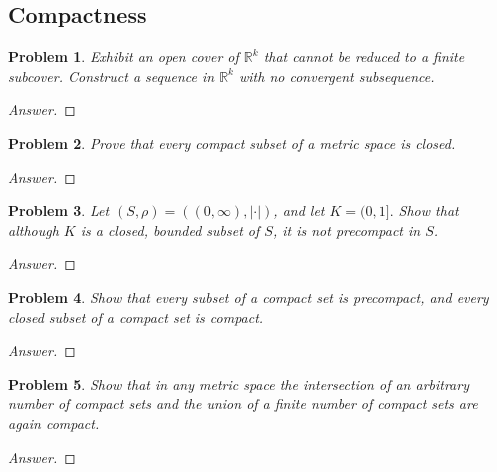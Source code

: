 \documentclass{article}
\newtheorem{problem}{Problem}[section]
\begin{document}
\subsection{Compactness}

\begin{problem}Exhibit an open cover of $\mathbb{R}^{k}$ that cannot be reduced to a finite subcover. Construct a sequence in $\mathbb{R}^{k}$ with no convergent subsequence.
\end{problem}

\begin{proof}[Answer]
    
\end{proof}

\begin{problem}Prove that every compact subset of a metric space is closed.
\end{problem}

\begin{proof}[Answer]
    
\end{proof}

\begin{problem}Let $(S, \rho)=((0, \infty),|\cdot|)$, and let $K=(0,1] .$ Show that although $K$ is a closed, bounded subset of $S$, it is not precompact in $S$.
\end{problem}

\begin{proof}[Answer]
    
\end{proof}

\begin{problem} Show that every subset of a compact set is precompact, and every closed subset of a compact set is compact.
\end{problem}

\begin{proof}[Answer]
    
\end{proof}

\begin{problem} Show that in any metric space the intersection of an arbitrary number of compact sets and the union of a finite number of compact sets are again compact.
\end{problem}

\begin{proof}[Answer]
    
\end{proof}
\end{document}
